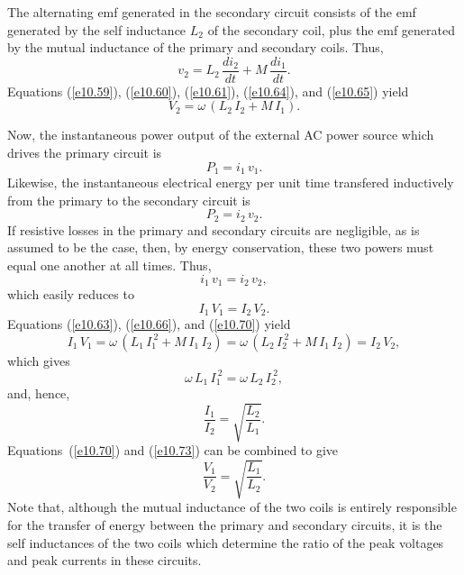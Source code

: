 The alternating emf generated in the secondary circuit consists of the
emf generated by the self inductance $L_2$ of the secondary coil, plus the
emf generated by the mutual inductance of the primary and secondary coils.
Thus,
\begin{equation}\label{e10.65}
v_2 = L_2\,\frac{di_2}{d t} + M\,\frac{di_1}{d t}.
\end{equation}
Equations  (\ref{e10.59}), (\ref{e10.60}), 
(\ref{e10.61}), (\ref{e10.64}), and (\ref{e10.65}) yield
\begin{equation}\label{e10.66}
V_2 = \omega \,(L_2\,I_2 + M\,I_1).
\end{equation}

Now, the instantaneous power output of the external AC power source which drives the
primary circuit is
\begin{equation}
P_1 = i_1\,v_1.
\end{equation}
Likewise, the instantaneous electrical energy per unit time transfered inductively from the
primary to the secondary circuit is
\begin{equation}
P_2 = i_2\,v_2.
\end{equation}
If resistive losses in the primary
and secondary circuits are negligible, as is assumed to be the case, then,
by energy conservation, these
two powers must  equal one another at all times. Thus,
\begin{equation}
i_1\,v_1= i_2\,v_2,
\end{equation}
which easily reduces to
\begin{equation}\label{e10.70}
I_1\,V_1 = I_2\, V_2.
\end{equation}
Equations (\ref{e10.63}), (\ref{e10.66}), and (\ref{e10.70}) yield
\begin{equation}
I_1\,V_1 = \omega\,(L_1\,I_1^{~2} + M\,I_1\,I_2)
= \omega \,(L_2\,I_2^{~2} + M\,I_1\,I_2) = I_2\,V_2,
\end{equation}
which gives 
\begin{equation}
\omega\,L_1\,I_1^{~2} = \omega \,L_2\,I_2^{~2},
\end{equation}
and, hence, 
\begin{equation}\label{e10.73}
\frac{I_1}{I_2} = \sqrt{\frac{L_2}{L_1}}.
\end{equation}
Equations~(\ref{e10.70}) and (\ref{e10.73}) can be combined to give
\begin{equation}
\frac{V_1}{V_2} =  \sqrt{\frac{L_1}{L_2}}.
\end{equation}
Note that, although the mutual inductance of the two coils is 
entirely responsible for the transfer of
energy  between the primary and secondary circuits, it is the self inductances
of the two coils which determine the ratio of the peak voltages and
peak currents in these circuits. 

